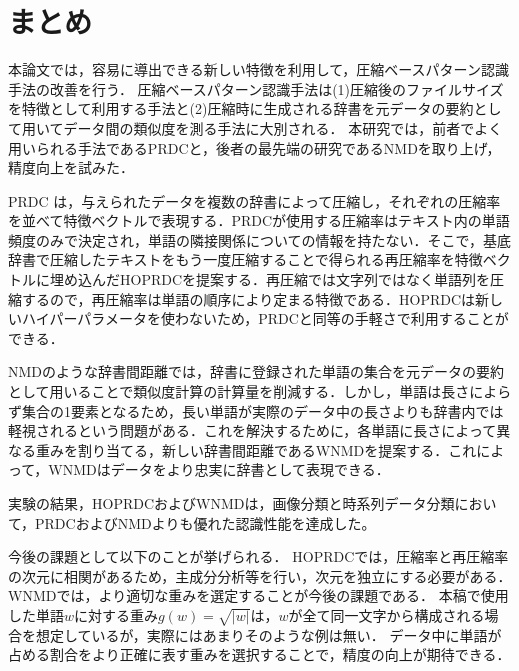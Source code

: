 \chapter{まとめ}
本論文では，容易に導出できる新しい特徴を利用して，圧縮ベースパターン認識手法の改善を行う．
圧縮ベースパターン認識手法は(1)圧縮後のファイルサイズを特徴として利用する手法と(2)圧縮時に生成される辞書を元データの要約として用いてデータ間の類似度を測る手法に大別される．
本研究では，前者でよく用いられる手法であるPRDCと，後者の最先端の研究であるNMDを取り上げ，精度向上を試みた．

PRDC は，与えられたデータを複数の辞書によって圧縮し，それぞれの圧縮率を並べて特徴ベクトルで表現する．PRDCが使用する圧縮率はテキスト内の単語頻度のみで決定され，単語の隣接関係についての情報を持たない．そこで，基底辞書で圧縮したテキストをもう一度圧縮することで得られる再圧縮率を特徴ベクトルに埋め込んだHOPRDCを提案する．再圧縮では文字列ではなく単語列を圧縮するので，再圧縮率は単語の順序により定まる特徴である．HOPRDCは新しいハイパーパラメータを使わないため，PRDCと同等の手軽さで利用することができる．


NMDのような辞書間距離では，辞書に登録された単語の集合を元データの要約として用いることで類似度計算の計算量を削減する．しかし，単語は長さによらず集合の1要素となるため，長い単語が実際のデータ中の長さよりも辞書内では軽視されるという問題がある．これを解決するために，各単語に長さによって異なる重みを割り当てる，新しい辞書間距離であるWNMDを提案する．これによって，WNMDはデータをより忠実に辞書として表現できる．

実験の結果，HOPRDCおよびWNMDは，画像分類と時系列データ分類において，PRDCおよびNMDよりも優れた認識性能を達成した。

今後の課題として以下のことが挙げられる．
HOPRDCでは，圧縮率と再圧縮率の次元に相関があるため，主成分分析等を行い，次元を独立にする必要がある．
WNMDでは，より適切な重みを選定することが今後の課題である．
本稿で使用した単語$w$に対する重み$g(w)=\sqrt{|w|}$は，$w$が全て同一文字から構成される場合を想定しているが，実際にはあまりそのような例は無い．
データ中に単語が占める割合をより正確に表す重みを選択することで，精度の向上が期待できる．

